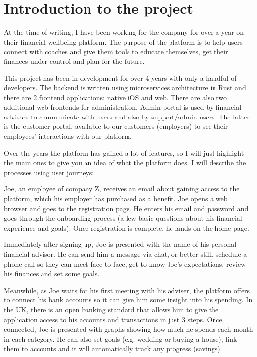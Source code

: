 \section{Introduction to the project}
At the time of writing, I have been working for the company for over a year on their financial wellbeing platform. The purpose of the platform is to help users connect with coaches and give them tools to educate themselves, get their finances under control and plan for the future.

This project has been in development for over 4 years with only a handful of developers. The backend is written using microservices architecture in Rust and there are 2 frontend applications: native iOS and web. There are also two additional web frontends for administration. Admin portal is used by financial advisors to communicate with users and also by support/admin users. The latter is the customer portal, available to our customers (employers) to see their employees' interactions with our platform.

Over the years the platform has gained a lot of features, so I will just highlight the main ones to give you an idea of what the platform does. I will describe the processes using user journeys:

\begin{example}[Sign Up]
    Joe, an employee of company Z, receives an email about gaining access to the platform, which his employer has purchased as a benefit. Joe opens a web browser and goes to the registration page. He enters his email and password and goes through the onboarding process (a few basic questions about his financial experience and goals). Once registration is complete, he lands on the home page.
\end{example}

\begin{example}[Advisor]
    Immediately after signing up, Joe is presented with the name of his personal financial advisor. He can send him a message via chat, or better still, schedule a phone call so they can meet face-to-face, get to know Joe's expectations, review his finances and set some goals.
\end{example}

\begin{example}[Analyse]
    Meanwhile, as Joe waits for his first meeting with his adviser, the platform offers to connect his bank accounts so it can give him some insight into his spending. In the UK, there is an open banking standard that allows him to give the application access to his accounts and transactions in just 3 steps. Once connected, Joe is presented with graphs showing how much he spends each month in each category. He can also set goals (e.g. wedding or buying a house), link them to accounts and it will automatically track any progress (savings).
\end{example}

